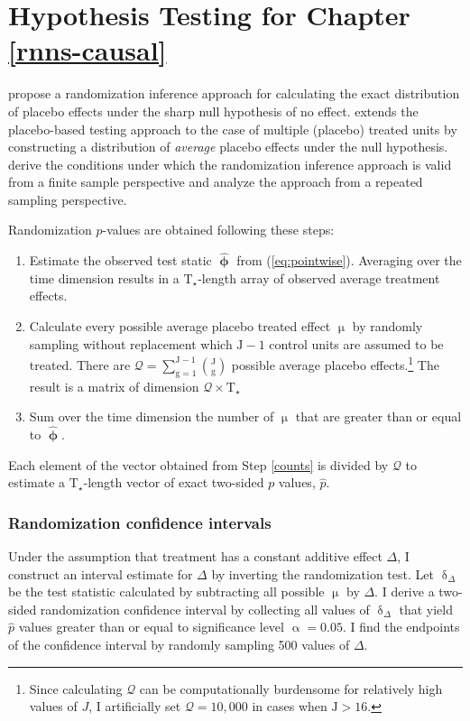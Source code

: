 \chapter{Hypothesis Testing for Chapter \ref{rnns-causal}} \label{eval}

\citet{abadie2010synthetic} propose a randomization inference approach for calculating the exact distribution of placebo effects under the sharp null hypothesis of no effect. \citet{cavallo2013catastrophic} extends the placebo-based testing approach to the case of multiple (placebo) treated units by constructing a distribution of \emph{average} placebo effects under the null hypothesis. \citet{firpo2018synthetic} derive the conditions under which the randomization inference approach is valid from a finite sample perspective and \citet{hahn2017synthetic} analyze the approach from a repeated sampling perspective.

Randomization $p$-values are obtained following these steps:

\begin{enumerate} 
	\item Estimate the observed test static $\boldsymbol{\hat{\upphi}}$ from (\ref{eq:pointwise}). Averaging over the time dimension results in a $\text{T}_\star$-length array of observed average treatment effects. 
	\item Calculate every possible average placebo treated effect $\upmu$ by randomly sampling without replacement which $\text{J}-1$ control units are assumed to be treated. There are $\mathcal{Q} = \sum\limits_{\text{g}=1}^{\text{J}-1} {\text{J} \choose \text{g}}$ possible average placebo effects.\footnote{Since calculating $\mathcal{Q}$ can be computationally burdensome for relatively high values of $J$, I artificially set $\mathcal{Q} = 10,000$ in cases when $\text{J} > 16$.} The result is a matrix of dimension $\mathcal{Q} \times \text{T}_\star$
	\item Sum over the time dimension the number of $\upmu$ that are greater than or equal to $\boldsymbol{\hat{\upphi}}$.  \label{counts}
\end{enumerate}

Each element of the vector obtained from Step \ref{counts} is divided by $\mathcal{Q}$ to estimate a $\text{T}_\star$-length vector of exact two-sided $p$ values, $\hat{p}$. 

\subsection{Randomization confidence intervals}

Under the assumption that treatment has a constant additive effect $\Delta$, I construct an interval estimate for $\Delta$ by inverting the randomization test. Let $\updelta_\Delta$ be the test statistic calculated by subtracting all possible $\upmu$ by $\Delta$. I derive a two-sided randomization confidence interval by collecting all values of $\updelta_\Delta$ that yield $\hat{p}$ values greater than or equal to significance level $\upalpha=0.05$. I find the endpoints of the confidence interval by randomly sampling 500 values of $\Delta$.